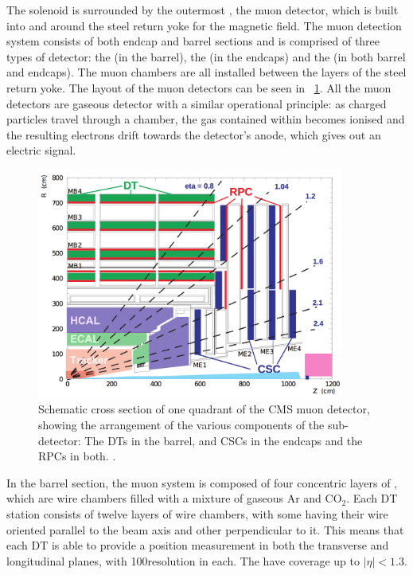 The solenoid is surrounded by the outermost \subdetector, the muon detector, which is built into and around the steel return yoke for the magnetic field.
The \CMS muon detection system consists of both endcap and barrel sections and is comprised of three types of detector: the \DTs (in the barrel), the \CSCs (in the endcaps) and the \RPCs (in both barrel and endcaps). The muon chambers are all installed between the layers of the steel return yoke. The layout of the muon detectors can be seen in \Fig~\ref{fig:muonssystem}. All the muon detectors are gaseous detector with a similar operational principle: as charged particles travel through a chamber, the gas contained within becomes ionised and the resulting electrons drift towards the detector's anode, which gives out an electric signal. 
\begin{figure}[h]
\centering
\includegraphics[width=0.9\textwidth]{detectorFigures/cmsMuonSystem.png}
\caption{Schematic cross section of one quadrant of the CMS muon detector, showing the arrangement of the various components of the sub-detector: The DTs in the barrel, and CSCs in the endcaps and the RPCs in both. \cite{MuonReco}.}
\label{fig:muonssystem}
\end{figure}

 In the barrel section, the muon system is composed of four concentric layers of \DTs, which are wire chambers filled with a mixture of gaseous Ar and CO$_{2}$. Each DT station consists of twelve layers of wire chambers, with some having their wire oriented parallel to the beam axis and other perpendicular to it. This means that each DT is able to provide a position measurement in both the transverse and longitudinal planes, with 100\um resolution in each. The \DTs have coverage up to $|\eta|<1.3$. 

